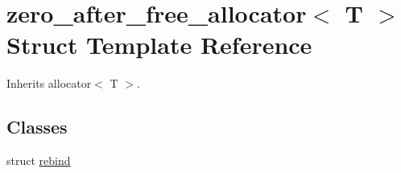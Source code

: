 \hypertarget{structzero__after__free__allocator}{}\section{zero\+\_\+after\+\_\+free\+\_\+allocator$<$ T $>$ Struct Template Reference}
\label{structzero__after__free__allocator}


Inherits allocator$<$ T $>$.

\subsection*{Classes}
\begin{DoxyCompactItemize}
\item 
struct \mbox{\hyperlink{structzero__after__free__allocator_1_1rebind}{rebind}}
\end{DoxyCompactItemize}
